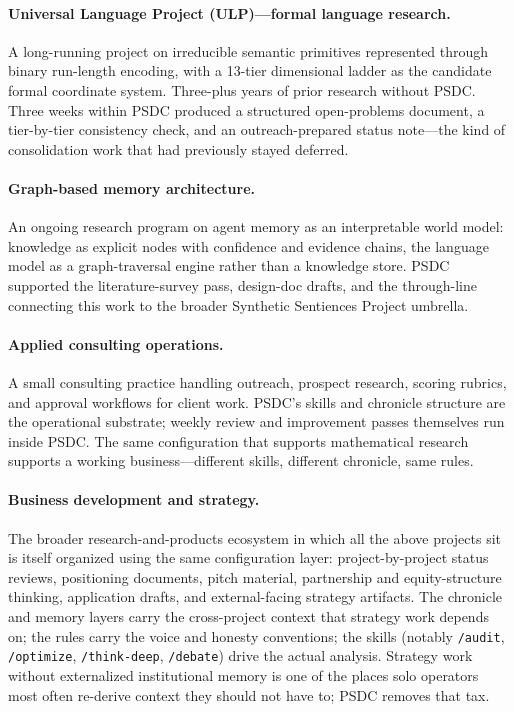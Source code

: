 \documentclass[12pt]{article}
\begin{document}
\paragraph{Universal Language Project (ULP)---formal language research.} A long-running project on irreducible semantic primitives represented through binary run-length encoding, with a 13-tier dimensional ladder as the candidate formal coordinate system. Three-plus years of prior research without PSDC. Three weeks within PSDC produced a structured open-problems document, a tier-by-tier consistency check, and an outreach-prepared status note---the kind of consolidation work that had previously stayed deferred.

\paragraph{Graph-based memory architecture.} An ongoing research program on agent memory as an interpretable world model: knowledge as explicit nodes with confidence and evidence chains, the language model as a graph-traversal engine rather than a knowledge store. PSDC supported the literature-survey pass, design-doc drafts, and the through-line connecting this work to the broader Synthetic Sentiences Project umbrella.

\paragraph{Applied consulting operations.} A small consulting practice handling outreach, prospect research, scoring rubrics, and approval workflows for client work. PSDC's skills and chronicle structure are the operational substrate; weekly review and improvement passes themselves run inside PSDC. The same configuration that supports mathematical research supports a working business---different skills, different chronicle, same rules.

\paragraph{Business development and strategy.} The broader research-and-products ecosystem in which all the above projects sit is itself organized using the same configuration layer: project-by-project status reviews, positioning documents, pitch material, partnership and equity-structure thinking, application drafts, and external-facing strategy artifacts. The chronicle and memory layers carry the cross-project context that strategy work depends on; the rules carry the voice and honesty conventions; the skills (notably \texttt{/audit}, \texttt{/optimize}, \texttt{/think-deep}, \texttt{/debate}) drive the actual analysis. Strategy work without externalized institutional memory is one of the places solo operators most often re-derive context they should not have to; PSDC removes that tax.
\end{document}
